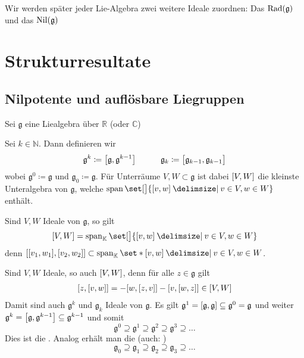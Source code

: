 Wir werden später jeder Lie-Algebra zwei weitere Ideale zuordnen: Das  $\Rad(\mathfrak{g})$ und das  $\Nil(\mathfrak{g})$ 

\chapter{Strukturresultate} %
\label{cha:2}
\section{Nilpotente und auflösbare Liegruppen} %
\label{sec:21}
Sei $\mathfrak{g}$ eine Liealgebra über $\mathbb{R}$ (oder $\mathbb{C}$)

\begin{definition}
	Sei $k \in \mathbb{N}$.
	Dann definieren wir
	\[
		\mathfrak{g}^k \coloneqq \benbrace*{\mathfrak{g},\mathfrak{g}^{k-1}} \qquad \quad \mathfrak{g}_k \coloneqq \benbrace[\big]{\mathfrak{g}_{k-1},\mathfrak{g}_{k-1}}
	\] 
	wobei $\mathfrak{g}^0 \coloneqq \mathfrak{g}$ und $\mathfrak{g}_0 \coloneqq \mathfrak{g}$.
	Für Unterräume $V,W \subset \mathfrak{g}$ ist dabei $\benbrace*{V,W}$ die kleinste Unteralgebra von $\mathfrak{g}$, welche $\Span \set[\big]{\benbrace*{v,w} \given v \in V, w \in W}$ enthält.
\end{definition}

Sind $V,W$ Ideale von $\mathfrak{g}$, so gilt
\[
	\benbrace*{V,W} = \Span_\mathbb{K} \set[\big]{\benbrace*{v,w} \given v \in V, w \in W}
\]
denn $\benbrace*{\benbrace*{v_1,w_1}, \benbrace*{v_2,w_2}} \subset \Span_\mathbb{K} \set*{\benbrace*{v,w} \given v \in V, w \in W}$.

Sind $V,W$ Ideale, so auch $\benbrace*{V,W}$, denn für alle $z \in \mathfrak{g}$ gilt
\begin{align}
	\benbrace*{z, \benbrace*{v,w}} = - \benbrace*{w, \benbrace*{z,v}} - \benbrace*{v,\benbrace*{w,z}} \in \benbrace*{V,W}
\end{align}
Damit sind auch $\mathfrak{g}^k$ und $\mathfrak{g}_k$ Ideale von $\mathfrak{g}$. Es gilt $\mathfrak{g}^1= \benbrace*{\mathfrak{g}, \mathfrak{g}} \subseteq \mathfrak{g}^0 = \mathfrak{g}$ und weiter $\mathfrak{g}^k = \benbrace*{\mathfrak{g},\mathfrak{g}^{k-1}} \subseteq \mathfrak{g}^{k-1}$ und somit
\[
	\mathfrak{g}^0 \supseteq \mathfrak{g}^1 \supseteq \mathfrak{g}^2 \supseteq \mathfrak{g}^3 \supseteq \ldots 
\]
Dies ist die . Analog erhält man die  (auch: )
\[
	\mathfrak{g}_0 \supseteq \mathfrak{g}_1 \supseteq \mathfrak{g}_2 \supseteq \mathfrak{g}_3 \supseteq \ldots 
\]

